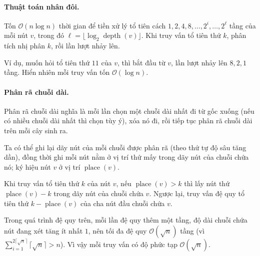 \documentclass[11pt]{article}
\newcommand{\Oh}{\mathcal{O}}
\begin{document}
\paragraph{Thuật toán nhân đôi.}
Tốn \(\Oh(n\log n)\) thời gian để tiền xử lý tổ tiên cách \(1,2,4,8,\ldots,
2^i,\ldots,2^\ell\) tầng của mỗi nút \(v\), trong đó
\(\ell=\lfloor\log_2\operatorname{depth}(v)\rfloor\). Khi truy vấn tổ tiên
thứ \(k\), phân tích nhị phân \(k\), rồi lần lượt nhảy lên.

Ví dụ, muốn hỏi tổ tiên thứ \(11\) của \(v\), thì bắt đầu từ \(v\), lần lượt
nhảy lên \(8,2,1\) tầng. Hiển nhiên mỗi truy vấn tốn \(\Oh(\log n)\).

\paragraph{Phân rã chuỗi dài.}
Phân rã chuỗi dài nghĩa là mỗi lần chọn một chuỗi dài nhất đi từ gốc xuống
(nếu có nhiều chuỗi dài nhất thì chọn tùy ý), xóa nó đi, rồi tiếp tục phân rã
chuỗi dài trên mỗi cây sinh ra.

Ta có thể ghi lại dãy nút của mỗi chuỗi được phân rã (theo thứ tự độ sâu tăng
dần), đồng thời ghi mỗi nút nằm ở vị trí thứ mấy trong dãy nút của chuỗi chứa
nó; ký hiệu nút \(v\) ở vị trí \(\operatorname{place}(v)\).

Khi truy vấn tổ tiên thứ \(k\) của nút \(v\), nếu \(\operatorname{place}(v)>k\)
thì lấy nút thứ \(\operatorname{place}(v)-k\) trong dãy nút của chuỗi chứa
\(v\). Ngược lại, truy vấn đệ quy tổ tiên thứ
\(k-\operatorname{place}(v)\) của cha nút đầu chuỗi chứa \(v\).

Trong quá trình đệ quy trên, mỗi lần đệ quy thêm một tầng, độ dài chuỗi chứa
nút đang xét tăng ít nhất \(1\), nên tối đa đệ quy \(\Oh(\sqrt n)\) tầng (vì
\(\sum_{i=1}^{2\lceil\sqrt n\rceil}\lceil\sqrt n\rceil>n\)). Vì vậy mỗi truy
vấn có độ phức tạp \(\Oh(\sqrt n)\).
\end{document}
